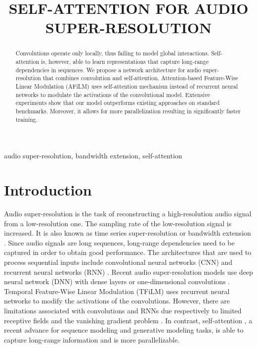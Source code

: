 \documentclass{article}
\title{SELF-ATTENTION FOR AUDIO SUPER-RESOLUTION}
\begin{document}
\maketitle

\begin{abstract}
Convolutions operate only locally, thus failing to model global interactions. Self-attention is, however, able to learn representations that capture long-range dependencies in sequences. We propose a network architecture for audio super-resolution that combines convolution and self-attention. Attention-based Feature-Wise Linear Modulation (AFiLM) uses self-attention mechanism instead of recurrent neural networks to modulate the activations of the convolutional model. Extensive experiments show that our model outperforms existing approaches on standard benchmarks. Moreover, it allows for more parallelization resulting in significantly faster training.

\end{abstract}
\begin{keywords}
audio super-resolution, bandwidth extension, self-attention
\end{keywords}
\section{Introduction}
\label{sec:intro}

Audio super-resolution is the task of reconstructing a high-resolution audio signal from a low-resolution one. The sampling rate of the low-resolution signal is increased. It is also known as time series super-resolution \cite{birnbaum2019temporal} or bandwidth extension \cite{ekstrand2002bandwidth}. Since audio signals are long sequences, long-range dependencies need to be captured in order to obtain good performance. The architectures that are used to process sequential inputs include convolutional neural networks (CNN) \cite{lecun1989backpropagation} and recurrent neural networks (RNN) \cite{elman1990finding, hochreiter1997long}. Recent audio super-resolution models use deep neural network (DNN) with dense layers \cite{li2015dnn} or one-dimensional convolutions \cite{kuleshov2017audio}. Temporal Feature-Wise Linear Modulation (TFiLM) \cite{birnbaum2019temporal} uses recurrent neural networks to modify the activations of the convolutions. However, there are limitations associated with convolutions and RNNs due respectively to limited receptive fields and the vanishing gradient problem \cite{bengio1994learning}. In contrast, self-attention \cite{vaswani2017attention}, a recent advance for sequence modeling and generative modeling tasks, is able to capture long-range information and is more parallelizable. 
\end{document}
